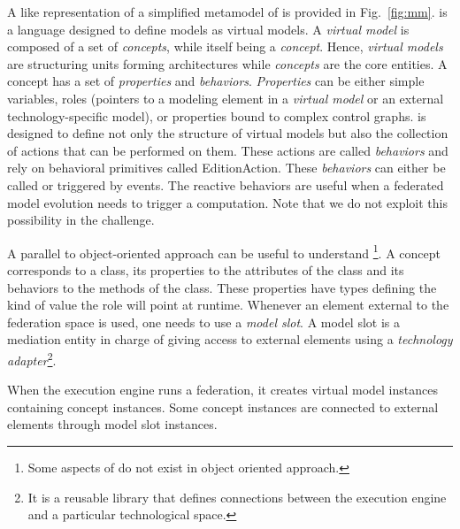A \UML like representation of a simplified metamodel of \FML is provided in Fig.~\ref{fig:mm}. \FML is a language designed to define models as virtual models. A \emph{virtual model} is composed of a set of \emph{concepts}, while itself being a \emph{concept}. Hence, \emph{virtual models} are structuring units forming architectures while \emph{concepts} are the core entities. A concept has a set of \emph{properties} and \emph{behaviors}. \emph{Properties} can be either simple variables, roles (pointers to a modeling element in a \emph{virtual model} or an external technology-specific model), or properties bound to complex control graphs. \FML is designed to define not only the structure of virtual models but also the collection of actions that can be performed on them. These actions are called \emph{behaviors} and rely on behavioral primitives called \textsf{EditionAction}. These \emph{behaviors} can either be called or triggered by events. The reactive behaviors are useful when a federated model evolution needs to trigger a computation. Note that we do not exploit this possibility in the challenge.

A parallel to object-oriented approach can be useful to understand \FML\footnote{Some aspects of \FML do not exist in object oriented approach.}. A concept corresponds to a class, its properties to the attributes of the class and its behaviors to the methods of the class. These properties have types defining the kind of value the role will point at runtime. Whenever an element external to the federation space is used, one needs to use a \emph{model slot}. A model slot is a mediation entity in charge of giving access to external elements using a \emph{technology adapter}\footnote{It is a reusable library that defines connections between the \FML execution engine and a particular technological space.}.

When the \FML execution engine runs a federation, it creates virtual
model instances containing concept instances. Some concept instances
are connected to external elements through model slot instances.



